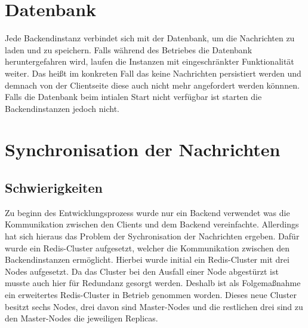 \section{Datenbank}
Jede Backendinstanz verbindet sich mit der Datenbank, um die Nachrichten zu laden und zu speichern.
Falls während des Betriebes die Datenbank heruntergefahren wird, laufen die Instanzen mit eingeschränkter Funktionalität weiter.
Das heißt im konkreten Fall das keine Nachrichten persistiert werden und demnach von der Clientseite diese auch nicht mehr angefordert werden könnnen.
Falls die Datenbank beim intialen Start nicht verfügbar ist starten die Backendinstanzen jedoch nicht.

\section{Synchronisation der Nachrichten}
\subsection{Schwierigkeiten}
Zu beginn des Entwicklungsprozess wurde nur ein Backend verwendet was die Kommunikation zwischen den Clients und dem Backend vereinfachte.
Allerdings hat sich hieraus das Problem der Sychronisation der Nachrichten ergeben.
Dafür wurde ein Redis-Cluster aufgesetzt, welcher die Kommunikation zwischen den Backendinstanzen ermöglicht.
Hierbei wurde initial ein Redis-Cluster mit drei Nodes aufgesetzt.
Da das Cluster bei den Ausfall einer Node abgestürzt ist musste auch hier für Redundanz gesorgt werden.
Deshalb ist als Folgemaßnahme ein erweitertes Redis-Cluster in Betrieb genommen worden.
Dieses neue Cluster besitzt sechs Nodes, drei davon sind Master-Nodes und die restlichen drei sind zu den Master-Nodes die jeweiligen Replicas.
